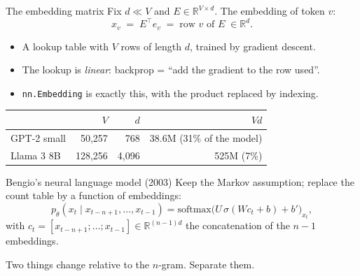 \documentclass[11pt,aspectratio=169]{beamer}
\newcommand{\R}{\mathbb{R}}
\newcommand{\ptheta}{p_{\theta}}
\newcommand{\sm}{\mathrm{softmax}}
\newcommand{\T}{^{\top}}
\begin{document}
\begin{frame}{The embedding matrix}
  Fix $d\ll V$ and $E\in\R^{V\times d}$. The embedding of token $v$:
  \[
    x_v \;=\; E\T e_v \;=\; \text{row } v \text{ of } E\;\in\R^d .
  \]

  \vspace{0.6em}
  \begin{itemize}
    \item A lookup table with $V$ rows of length $d$, trained by gradient descent.
    \item The lookup is \emph{linear}: backprop = ``add the gradient to the row used''.
    \item \texttt{nn.Embedding} is exactly this, with the product replaced by indexing.
  \end{itemize}

  \vspace{0.8em}
  \begin{tabular}{@{}lrrr@{}}
    \toprule
    & $V$ & $d$ & $Vd$ \\
    \midrule
    GPT-2 small & 50{,}257 & 768 & 38.6M \quad(31\% of the model) \\
    Llama 3 8B & 128{,}256 & 4{,}096 & 525M \quad(7\%) \\
    \bottomrule
  \end{tabular}
\end{frame}

\begin{frame}{Bengio's neural language model (2003)}
  Keep the Markov assumption; replace the count table by a function of embeddings:
  \[
    \ptheta(x_t\mid x_{t-n+1},\dots,x_{t-1}) = \sm\big(U\,\sigma(Wc_t + b) + b'\big)_{x_t},
  \]
  with $c_t = [x_{t-n+1};\dots;x_{t-1}]\in\R^{(n-1)d}$ the concatenation of the $n-1$ embeddings.

  \vspace{0.6em}
  \begin{center}
  \end{center}

  \vspace{0.4em}
  Two things change relative to the $n$-gram. Separate them.
\end{frame}
\end{document}
